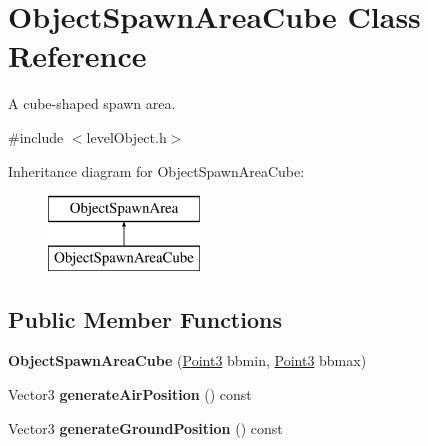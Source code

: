 \hypertarget{classObjectSpawnAreaCube}{
\section{\-Object\-Spawn\-Area\-Cube \-Class \-Reference}
\label{df/d33/classObjectSpawnAreaCube}
}


\-A cube-\/shaped spawn area.  




{\ttfamily \#include $<$level\-Object.\-h$>$}

\-Inheritance diagram for \-Object\-Spawn\-Area\-Cube\-:\begin{figure}[H]
\begin{center}
\leavevmode
\includegraphics[height=2.000000cm]{df/d33/classObjectSpawnAreaCube}
\end{center}
\end{figure}
\subsection*{\-Public \-Member \-Functions}
\begin{DoxyCompactItemize}
\item 
\hypertarget{classObjectSpawnAreaCube_a09ade66a3fc0dbdb55d46d08bd788913}{
{\bfseries \-Object\-Spawn\-Area\-Cube} (\hyperlink{classPoint3}{\-Point3} bbmin, \hyperlink{classPoint3}{\-Point3} bbmax)}
\label{df/d33/classObjectSpawnAreaCube_a09ade66a3fc0dbdb55d46d08bd788913}

\item 
\hypertarget{classObjectSpawnAreaCube_ae00bb1a98977bf0ee5d369b4d302f186}{
\-Vector3 {\bfseries generate\-Air\-Position} () const }
\label{df/d33/classObjectSpawnAreaCube_ae00bb1a98977bf0ee5d369b4d302f186}

\item 
\hypertarget{classObjectSpawnAreaCube_ac75b91b6da867099d3dcf18cd7ba9cc5}{
\-Vector3 {\bfseries generate\-Ground\-Position} () const }
\label{df/d33/classObjectSpawnAreaCube_ac75b91b6da867099d3dcf18cd7ba9cc5}

\end{DoxyCompactItemize}
